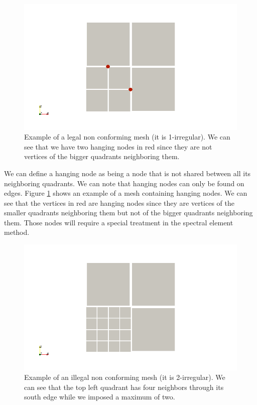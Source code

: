 \begin{figure}
\centering
\includegraphics[scale=0.45]{Theory/hang_ex.png}
\caption{Example of a legal non conforming mesh (it is 1-irregular). We can see that we have two hanging nodes in red since they are not vertices of the bigger quadrants neighboring them.}
\label{hang_ex}
\end{figure}

We can define a hanging node as being a node that is not shared between all its neighboring quadrants. We can note that hanging nodes can only be found on edges. Figure \ref{hang_ex} shows an example of a mesh containing hanging nodes. We can see that the vertices in red are hanging nodes since they are vertices of the smaller quadrants neighboring them but not of the bigger quadrants neighboring them. Those nodes will require a special treatment in the spectral element method. 

\begin{figure}
\centering
\includegraphics[scale=0.45]{Theory/hang_illegal.png}
\caption{Example of an illegal non conforming mesh (it is 2-irregular). We can see that the top left quadrant has four neighbors through its south edge while we imposed a maximum of two. }
\label{hang_illegal}
\end{figure}

